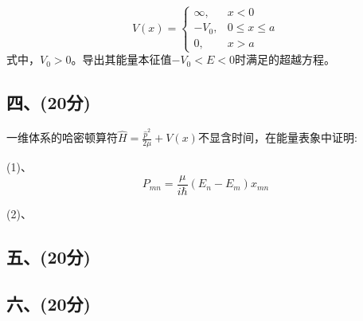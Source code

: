 \[
V(x) = \begin{cases} 
\infty, & x < 0 \\
-V_0, & 0 \leq x \leq a \\
0, & x > a
\end{cases}~
\] 
式中，$V_0>0$。导出其能量本征值$-V_0<E<0$时满足的超越方程。
\subsection{四、(20分)}
一维体系的哈密顿算符$\hat{H}=\frac{\hat{p}^2}{2\mu}+V(x)$不显含时间，在能量表象中证明:

(1)、$$P_{mn}=\frac{\mu}{i\hbar}(E_n-E_m)x_{mn}~$$

(2)、
\subsection{五、(20分)}

\subsection{六、(20分)}